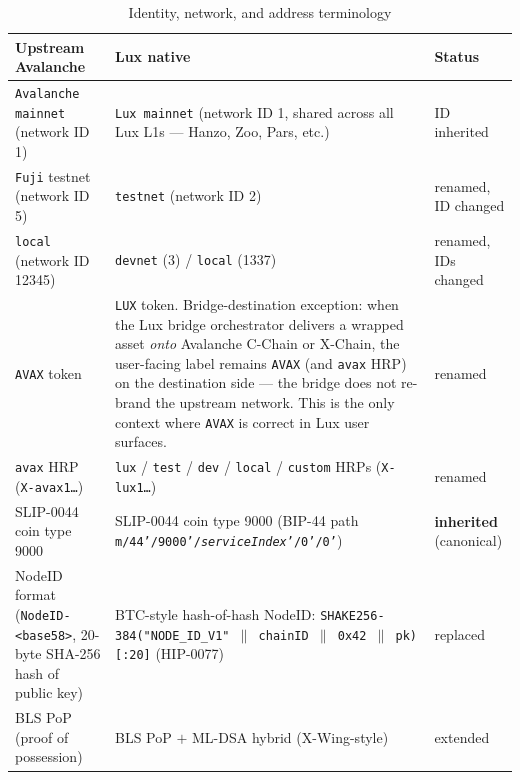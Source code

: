 \begin{table}[h]
\centering
\small
\caption{Identity, network, and address terminology}
\label{tab:trans-network}
\begin{tabular}{p{4.3cm} p{6.5cm} p{2.5cm}}
\toprule
\textbf{Upstream Avalanche} & \textbf{Lux native} & \textbf{Status} \\
\midrule
\texttt{Avalanche mainnet} (network ID 1)
  & \texttt{Lux mainnet} (network ID 1, shared across all Lux L1s ---
    Hanzo, Zoo, Pars, etc.)
  & ID inherited \\
\texttt{Fuji} testnet (network ID 5)
  & \texttt{testnet} (network ID 2)
  & renamed, ID changed \\
\texttt{local} (network ID 12345)
  & \texttt{devnet} (3) / \texttt{local} (1337)
  & renamed, IDs changed \\
\texttt{AVAX} token
  & \texttt{LUX} token. Bridge-destination exception: when the Lux
    bridge orchestrator delivers a wrapped asset \emph{onto} Avalanche
    C-Chain or X-Chain, the user-facing label remains \texttt{AVAX}
    (and \texttt{avax} HRP) on the destination side --- the bridge does
    not re-brand the upstream network. This is the only context where
    \texttt{AVAX} is correct in Lux user surfaces.
  & renamed \\
\texttt{avax} HRP (\texttt{X-avax1\dots})
  & \texttt{lux} / \texttt{test} / \texttt{dev} / \texttt{local} /
    \texttt{custom} HRPs (\texttt{X-lux1\dots})
  & renamed \\
SLIP-0044 coin type 9000
  & SLIP-0044 coin type 9000 (BIP-44 path
    \texttt{m/44'/9000'/\textit{serviceIndex}'/0'/0'})
  & \textbf{inherited} (canonical) \\
NodeID format (\texttt{NodeID-<base58>}, 20-byte SHA-256 hash of public key)
  & BTC-style hash-of-hash NodeID:
    \texttt{SHAKE256-384("NODE\_ID\_V1" $\|$ chainID $\|$ 0x42 $\|$ pk)[:20]}
    (HIP-0077)
  & replaced \\
BLS PoP (proof of possession)
  & BLS PoP $+$ ML-DSA hybrid (X-Wing-style)
  & extended \\
\bottomrule
\end{tabular}
\end{table}

